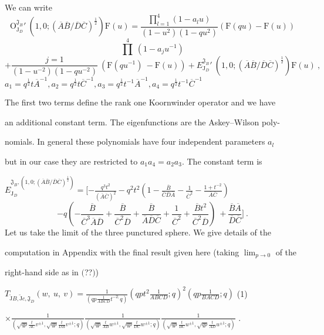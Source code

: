 \documentclass[a4paper,12pt]{article}
\begin{document}
We can write
$$
\mathrm{O}_{\mathrm{J}_{D}}^{\mathfrak{J}_{B}}'\ (1,0;(\overline{A}\overline{B}/\overline{D}\overline{C})^{\frac{1}{2}})\mathrm{F}(u)=\frac{\prod_{l=1}^{4}(1-a_{l}u)}{(1-u^{2})(1-qu^{2})}(\mathrm{F}(qu)-\mathrm{F}(u))
$$
$$
\prod^{4}\ (1-a_{j}u^{-1})
$$
$$
+\frac{j=1}{(1-u^{-2})(1-qu^{-2})}\ (\mathrm{F}(qu^{-1})\ -\mathrm{F}(u))+E_{\mathrm{J}_{D}}^{\mathfrak{J}_{B}}'\ (1,0;(\overline{A}\overline{B}/\overline{D}\overline{C})^{\frac{1}{2}})\mathrm{F}(u)\ ,
$$
$a_{1}=q^{\frac{1}{2}}t\overline{A}^{-1}, a_{2}=q^{\frac{1}{2}}t\overline{C}^{-1}, a_{3}=q^{\frac{1}{2}}t^{-1}\overline{A}^{-1}, a_{4}=q^{\frac{1}{2}}t^{-1}\overline{C}^{-1}$

The first two terms define the rank one Koornwinder operator and we have

an additional constant term. The eigenfunctions are the Askey–Wilson poly-

nomials. In general these polynomials have four independent parameters $a_{l}$

but in our case they are restricted to $a_{1}a_{4}=a_{2}a_{3}$. The constant term is

$E_{\mathrm{J}_{D}}^{\mathfrak{J}_{B},(1,0;(\overline{A}\overline{B}/\overline{D}\overline{C})^{\frac{1}{2}})} = [-\displaystyle \frac{q^{3}t^{2}}{(\overline{A}\overline{C})^{2}}-q^{2}t^{2} (1-\displaystyle \frac{\overline{B}}{\overline{C}\overline{D}\overline{A}}-\frac{1}{\overline{C}^{2}}-\frac{1+t^{-2}}{\overline{A}\overline{C}})$
$$
-q(-\frac{\overline{B}}{\overline{C}^{3}\overline{A}\overline{D}}+\frac{\overline{B}}{\overline{C}^{2}\overline{D}}+\frac{\overline{B}}{\overline{A}\overline{D}\overline{C}}+\frac{1}{\overline{C}^{2}}+\frac{\overline{B}t^{2}}{\overline{C}^{2}\overline{D}})\ +\frac{\overline{B}\overline{A}}{\overline{D}\overline{C}}]\ .
$$
Let us take the limit of the three punctured sphere. We give details of the

computation in Appendix with the final result given here (taking $\displaystyle \lim_{p\rightarrow 0}$ of the

right-hand side as in $($??$)$)

$T_{\tilde{\mathrm{J}}B,\tilde{\mathrm{J}}c,\mathfrak{J}_{D}}(w,\displaystyle \ u,\ v)=\frac{1}{(qp\frac{1}{ABCD}t^{-2;}q)} (qpt^{2}\displaystyle \frac{1}{ABCD};q)^{2} (qp\displaystyle \frac{1}{BACD};q)$ (1)

$\times \displaystyle \frac{1}{(\sqrt{qp}\frac{t}{AC}v^{\pm 1},\sqrt{qp}\frac{t}{DB}v^{\pm 1};q)}\frac{1}{(\sqrt{qp}\frac{t}{AB}w^{\pm 1},\sqrt{qp}\frac{t}{DC}w^{\pm 1};q)}\frac{1}{(\sqrt{qp}\frac{t}{BC}u^{\pm 1},\sqrt{qp}\frac{t}{AD}u^{\pm 1};q)}$ .
\end{document}

